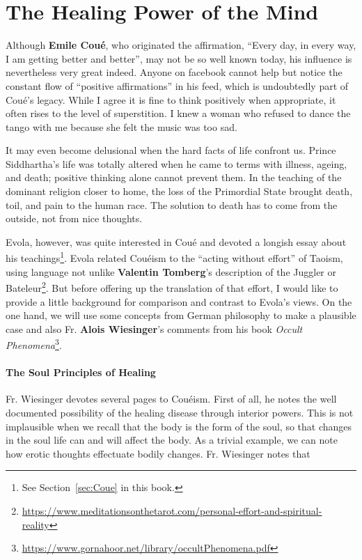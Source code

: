 \section{The Healing Power of the Mind}

Although \textbf{Emile Coué}, who originated the affirmation, “Every day, in every way, I am getting better and better”, may not be so well known today, his influence is nevertheless very great indeed. Anyone on facebook cannot help but notice the constant flow of “positive affirmations” in his feed, which is undoubtedly part of Coué's legacy. While I agree it is fine to think positively when appropriate, it often rises to the level of superstition. I knew a woman who refused to dance the tango with me because she felt the music was too sad.

It may even become delusional when the hard facts of life confront us. Prince Siddhartha's life was totally altered when he came to terms with illness, ageing, and death; positive thinking alone cannot prevent them. In the teaching of the dominant religion closer to home, the loss of the Primordial State brought death, toil, and pain to the human race. The solution to death has to come from the outside, not from nice thoughts.

Evola, however, was quite interested in Coué and devoted a longish essay about his teachings\footnote{See Section~\ref{sec:Coue} in this book.}. Evola related Couéism to the “acting without effort” of Taoism, using language not unlike \textbf{Valentin Tomberg}'s description of the Juggler or Bateleur\footnote{\url{https://www.meditationsonthetarot.com/personal-effort-and-spiritual-reality}}. But before offering up the translation of that effort, I would like to provide a little background for comparison and contrast to Evola's views. On the one hand, we will use some concepts from German philosophy to make a plausible case and also Fr. \textbf{Alois Wiesinger}'s comments from his book \emph{Occult Phenomena}\footnote{\url{https://www.gornahoor.net/library/occultPhenomena.pdf}}.

\paragraph{The Soul Principles of Healing}
Fr. Wiesinger devotes several pages to Couéism. First of all, he notes the well documented possibility of the healing disease through interior powers. This is not implausible when we recall that the body is the form of the soul, so that changes in the soul life can and will affect the body. As a trivial example, we can note how erotic thoughts effectuate bodily changes. Fr. Wiesinger notes that


